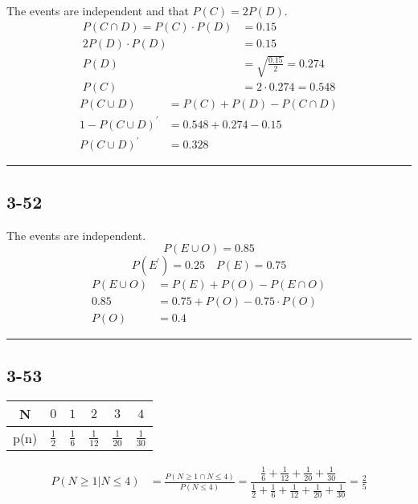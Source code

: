 \documentclass{article}
\newcommand{\qline}{\par\noindent\rule{4.5in}{1pt}}
\begin{document}
		The events are independent and that $P(C)=2P(D)$.
		\begin{align*}
			P(C \cap D) = P(C) \cdot P(D) &= 0.15 \\
			2P(D) \cdot P(D) &= 0.15 \\
			P(D) &= \sqrt{\frac{0.15}{2}} = 0.274 \\
			P(C) &= 2 \cdot 0.274 = 0.548
		\end{align*}
		\begin{align*}
			P(C \cup D) &= P(C) + P(D) - P(C \cap D) \\
			1 - P(C \cup D)^\prime &= 0.548 + 0.274 - 0.15 \\
			P(C \cup D)^\prime &= \boxed{0.328}
		\end{align*}

	\qline

	\subsection*{3-52}

		The events are independent.
		\[
			P(E \cup O) = 0.85
		\]
		\[
			P(E^\prime) = 0.25 \quad P(E) = 0.75
		\]
		\begin{align*}
			P(E \cup O) &= P(E) + P(O) - P(E \cap O) \\
			0.85 &= 0.75 + P(O) - 0.75 \cdot P(O) \\
			P(O) &= \boxed{0.4}
		\end{align*}

	\qline

	\subsection*{3-53}

		\begin{center}
			\renewcommand\arraystretch{1.2}
			\begin{tabular}{c|c|c|c|c|c}
				N & $0$ & $1$ & $2$ & $3$ & $4$ \\ \hline
				p(n) & $\frac{1}{2}$ & $\frac{1}{6}$ & $\frac{1}{12}$ & $\frac{1}{20}$ & $\frac{1}{30}$ \\
			\end{tabular}
		\end{center}

		\begin{align*}
			P(N \geq 1 | N \leq 4) &= \frac{P(N \geq 1 \cap N \leq 4)}{P(N \leq 4)}
			= \dfrac{\frac{1}{6} + \frac{1}{12} + \frac{1}{20} + \frac{1}{30}}{\frac{1}{2} + \frac{1}{6} + \frac{1}{12} + \frac{1}{20} + \frac{1}{30}}
			= \boxed{\frac{2}{5}}
		\end{align*}
\end{document}
